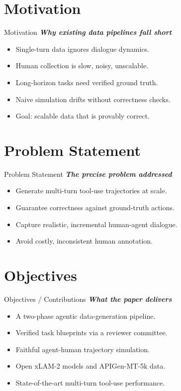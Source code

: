 \documentclass{beamer}
\begin{document}
\section{Motivation}
\begin{frame}{Motivation}
\textbf{\textit{Why existing data pipelines fall short}}
\begin{itemize}
\item Single-turn data ignores dialogue dynamics.
\item Human collection is slow, noisy, unscalable.
\item Long-horizon tasks need verified ground truth.
\item Naive simulation drifts without correctness checks.
\item Goal: scalable data that is provably correct.
\end{itemize}
\end{frame}

\section{Problem Statement}
\begin{frame}{Problem Statement}
\textbf{\textit{The precise problem addressed}}
\begin{itemize}
\item Generate multi-turn tool-use trajectories at scale.
\item Guarantee correctness against ground-truth actions.
\item Capture realistic, incremental human-agent dialogue.
\item Avoid costly, inconsistent human annotation.
\end{itemize}
\end{frame}

\section{Objectives}
\begin{frame}{Objectives / Contributions}
\textbf{\textit{What the paper delivers}}
\begin{itemize}
\item A two-phase agentic data-generation pipeline.
\item Verified task blueprints via a reviewer committee.
\item Faithful agent-human trajectory simulation.
\item Open xLAM-2 models and APIGen-MT-5k data.
\item State-of-the-art multi-turn tool-use performance.
\end{itemize}
\end{frame}
\end{document}
